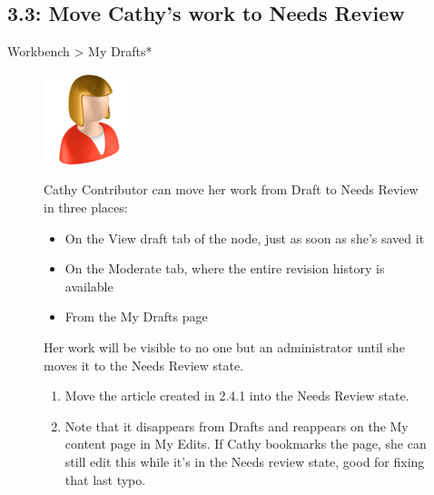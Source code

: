 \documentclass[letterpaper,10pt,english]{sphinxmanual}
\begin{document}
\subsection{3.3: Move Cathy's work to Needs Review}
\label{workbench:move-cathy-s-work-to-needs-review}
Workbench \textgreater{} My Drafts*
\begin{figure}[htbp]
\centering

\includegraphics{contributor.png}
{\small 
Cathy Contributor can move her work from Draft to Needs Review in three places:
\begin{itemize}
\item {} 
On the View draft tab of the node, just as soon as she's saved it

\item {} 
On the Moderate tab, where the entire revision history is available

\item {} 
From the My Drafts page

\end{itemize}

Her work will be visible to no one but an administrator until she moves it to the Needs Review state.
\begin{enumerate}
\item {} 
Move the article created in 2.4.1 into the Needs Review state.

\item {} 
Note that it disappears from Drafts and reappears on the My content page in My Edits. If Cathy bookmarks the page, she can still edit this while it's in the Needs review state, good for fixing that last typo.

\end{enumerate}
}\end{figure}
\end{document}
